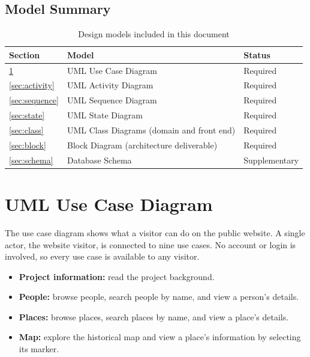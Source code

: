\documentclass[11pt]{article}
\begin{document}
\subsection{Model Summary}

\begin{table}[H]
  \centering
  \begin{tabularx}{\linewidth}{@{}l X l@{}}
    \toprule
    \textbf{Section} & \textbf{Model} & \textbf{Status} \\
    \midrule
    \ref{sec:usecase}  & UML Use Case Diagram                      & Required \\
    \ref{sec:activity} & UML Activity Diagram                      & Required \\
    \ref{sec:sequence} & UML Sequence Diagram                      & Required \\
    \ref{sec:state}    & UML State Diagram                         & Required \\
    \ref{sec:class}    & UML Class Diagrams (domain and front end) & Required \\
    \ref{sec:block}    & Block Diagram (architecture deliverable)  & Required \\
    \ref{sec:schema}   & Database Schema                           & Supplementary \\
    \bottomrule
  \end{tabularx}
  \caption{Design models included in this document}
\end{table}

\clearpage
\section{UML Use Case Diagram}\label{sec:usecase}

The use case diagram shows what a visitor can do on the public website. A single
actor, the website visitor, is connected to nine use cases. No account or login
is involved, so every use case is available to any visitor.

\begin{itemize}
  \item \textbf{Project information:} read the project background.
  \item \textbf{People:} browse people, search people by name, and view a
        person's details.
  \item \textbf{Places:} browse places, search places by name, and view a
        place's details.
  \item \textbf{Map:} explore the historical map and view a place's information
        by selecting its marker.
\end{itemize}
\end{document}
